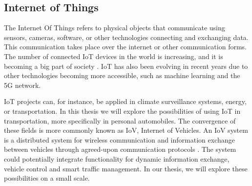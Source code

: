 \subsection{Internet of Things}

The Internet Of Things refers to physical objects that communicate using sensors, cameras, software, or other technologies connecting and exchanging data. This communication takes place over the internet or other communication forms. The number of connected IoT devices in the world is increasing, and it is becoming a big part of society \parencite{iot_analytics}. IoT has also been evolving in recent years due to other technologies becoming more accessible, such as machine learning and the 5G network.

IoT projects can, for instance, be applied in climate surveillance systems, energy, or transportation. In this thesis we will explore the possibilities of using IoT in transportation, more specifically in personal automobiles. The convergence of these fields is more commonly known as IoV, Internet of Vehicles. An IoV system is a distributed system for wireless communication and information exchange between vehicles through agreed-upon communication protocols \parencite{chinese_iov}. The system could potentially integrate functionality for dynamic information exchange, vehicle control and smart traffic management. In our thesis, we will explore these possibilities on a small scale.